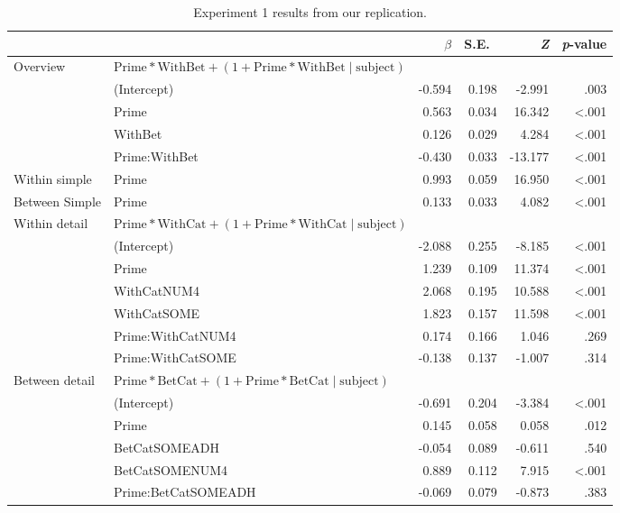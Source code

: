 \documentclass[10pt]{article}
\begin{document}
\begin{multicols}{2}
\begin{table*}[ht]
  \caption{Experiment 1 results from our replication.}\vspace{-20pt}
  \begin{center}
    \begin{tabular}{llrrrr}
      \hline
      & & \(\beta\) & S.E.\ & \emph{Z} & \emph{p}-value  \\
      \hline
      Overview & \(\text{Prime} * \text{WithBet} + (1 + \text{Prime} * \text{WithBet} \mid \text{subject})\) & & & \\
      & (Intercept) & -0.594 & 0.198 & -2.991 & .003 \\
      & Prime & 0.563 & 0.034 & 16.342 & <.001 \\
      & WithBet & 0.126 & 0.029 & 4.284 & <.001 \\
      & Prime:WithBet & -0.430 & 0.033 & -13.177 & <.001 \\
      Within simple & Prime & 0.993 & 0.059 & 16.950 & <.001 \\
      Between Simple & Prime & 0.133 & 0.033 & 4.082 & <.001 \\
      Within detail & \multicolumn{2}{l}{\(\text{Prime} * \text{WithCat} + (1 + \text{Prime} * \text{WithCat} \mid \text{subject})\)}  & & & \\
      & (Intercept)  & -2.088 & 0.255 & -8.185 & <.001\\
      & Prime & 1.239 & 0.109 & 11.374 & <.001 \\
      & WithCatNUM4 & 2.068 & 0.195 & 10.588 & <.001 \\
      & WithCatSOME & 1.823 & 0.157 & 11.598 & <.001 \\
      & Prime:WithCatNUM4 & 0.174 & 0.166 & 1.046 & .269 \\
      & Prime:WithCatSOME & -0.138 & 0.137 & -1.007 & .314 \\
      Between detail & \multicolumn{2}{l}{\(\text{Prime} * \text{BetCat} + (1 + \text{Prime} * \text{BetCat} \mid \text{subject})\)}  & & & \\
      & (Intercept)  & -0.691 & 0.204 & -3.384 & <.001\\
      & Prime & 0.145 & 0.058 & 0.058 & .012 \\
      & BetCatSOMEADH & -0.054 & 0.089 & -0.611 & .540 \\
      & BetCatSOMENUM4 & 0.889 & 0.112 & 7.915 & <.001 \\
      & Prime:BetCatSOMEADH & -0.069 & 0.079 & -0.873 & .383 \\

\end{tabular}
\end{center}
\end{table*}
\end{multicols}
\end{document}
